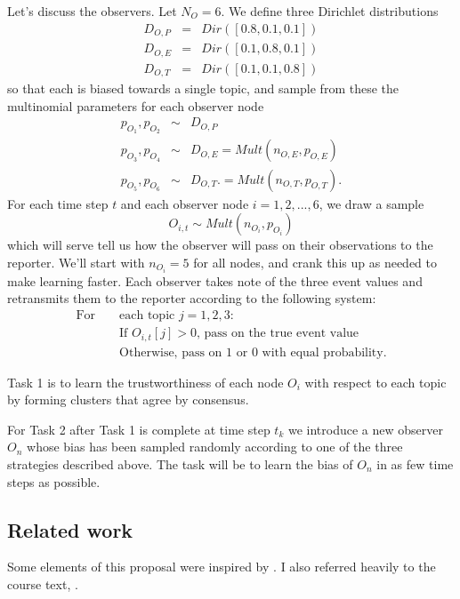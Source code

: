 \documentclass{amsart}
\theoremstyle{definition}
\theoremstyle{plain}
\numberwithin{equation}{section}
\begin{document}
Let's discuss the observers. Let $N_{O}=6$. We define three Dirichlet
distributions 
\begin{eqnarray*}
D_{O,P} &=&Dir\left( \left[ 0.8,0.1,0.1\right] \right)  \\
D_{O,E} &=&Dir\left( \left[ 0.1,0.8,0.1\right] \right)  \\
D_{O,T} &=&Dir\left( \left[ 0.1,0.1,0.8\right] \right) 
\end{eqnarray*}%
so that each is biased towards a single topic, and sample from these the
multinomial parameters for each observer node 
\begin{eqnarray*}
p_{O_{1}},p_{O_{2}} &\sim &D_{O,P} \\
p_{O_{3}},p_{O_{4}} &\sim &D_{O,E}=Mult\left( n_{O,E},p_{O,E}\right)  \\
p_{O_{5}},p_{O_{6}} &\sim &D_{O,T}.=Mult\left( n_{O,T},p_{O,T}\right) .
\end{eqnarray*}%
For each time step $t$ and each observer node $i=1,2,...,6$, we draw a sample%
\begin{equation*}
O_{i,t}\sim Mult\left( n_{O_{i}},p_{O_{i}}\right) 
\end{equation*}%
which will serve tell us how the observer will pass on their observations to
the reporter. We'll start with $n_{O_{i}}=5$ for all nodes, and crank this
up as needed to make learning faster. Each observer takes note of the three
event values and retransmits them to the reporter according to the following
system:%
\begin{eqnarray*}
\text{For } &&\text{each topic }j=1,2,3\text{:} \\
&&\text{If }O_{i,t}[j]>0\text{, pass on the true event value} \\
&&\text{Otherwise, pass on }1\text{ or }0\text{ with equal probability.}
\end{eqnarray*}

Task 1 is to learn the trustworthiness of each node $O_{i}$ with respect to
each topic by forming clusters that agree by consensus. 

For Task 2 after Task 1 is complete at time step $t_{k}$ we introduce a new
observer $O_{n}$ whose bias has been sampled randomly according to one of
the three strategies described above. The task will be to learn the bias of $%
O_{n}$ in as few time steps as possible.

\bigskip 

\subsection{Related work}

Some elements of this proposal were inspired by \cite%
{levchuk2015probabilistic}. I also referred heavily to the course text, \cite%
{koller2009probabilistic}.

\nocite{wasserman2013all}



\end{document}
